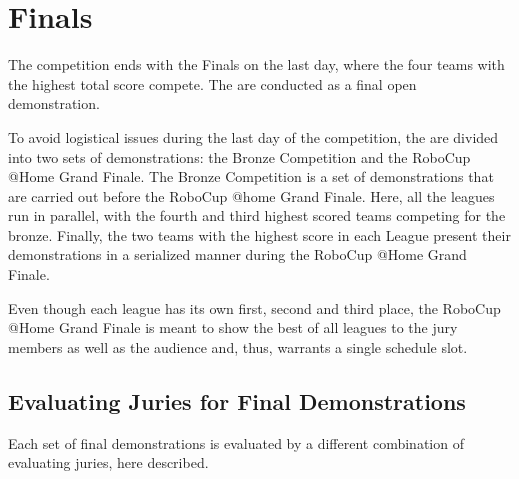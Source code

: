 \chapter{Finals}

The competition ends with the Finals on the last day, where the four teams with the highest total score compete.
The  are conducted as a final open demonstration.

To avoid logistical issues during the last day of the competition, the  are divided into two sets of demonstrations: the Bronze Competition and the RoboCup @Home Grand Finale.
The Bronze Competition is a set of demonstrations that are carried out before the RoboCup @home Grand Finale. Here, all the leagues run in parallel, with the fourth and third highest scored teams competing for the bronze.
Finally, the two teams with the highest score in each League present their demonstrations in a serialized manner during the RoboCup @Home Grand Finale.

Even though each league has its own first, second and third place, the RoboCup @Home Grand Finale is meant to show the best of all leagues to the jury members as well as the audience and, thus, warrants a single schedule slot.

\section{Evaluating Juries for Final Demonstrations}
Each set of final demonstrations is evaluated by a different combination of evaluating juries, here described.

